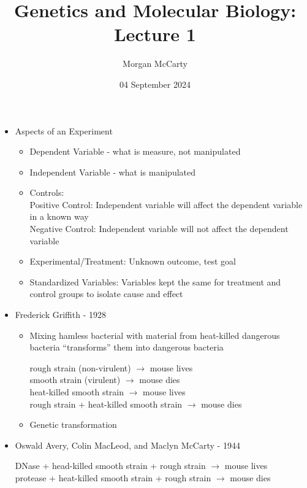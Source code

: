 \documentclass[12pt]{article}
\title{
    Genetics and Molecular Biology: Lecture 1}
\author{Morgan McCarty}
\date{04 September 2024}
\begin{document}
    \maketitle

    \begin{itemize}
        \item Aspects of an Experiment
        \begin{itemize}
            \item Dependent Variable - what is measure, not manipulated
            \item Independent Variable - what is manipulated
            \item Controls: \\
            Positive Control: Independent variable will affect the dependent variable in a known way \\
            Negative Control: Independent variable will not affect the dependent variable 
            \item Experimental/Treatment: Unknown outcome, test goal
            \item Standardized Variables: Variables kept the same for treatment and control groups to isolate cause and effect
        \end{itemize}
        \item Frederick Griffith - 1928
        \begin{itemize}
            \item Mixing hamless bacterial with material from heat-killed dangerous bacteria ``transforms'' them into dangerous bacteria
            \begin{center}
                rough strain (non-virulent) $\rightarrow$ mouse lives \\
                smooth strain (virulent) $\rightarrow$ mouse dies \\
                heat-killed smooth strain $\rightarrow$ mouse lives \\
                rough strain + heat-killed smooth strain $\rightarrow$ mouse dies
            \end{center}
            \item Genetic transformation
        \end{itemize}
        \item Oswald Avery, Colin MacLeod, and Maclyn McCarty - 1944
        \begin{center}
            DNase + head-killed smooth strain + rough strain $\rightarrow$ mouse lives \\
            protease + heat-killed smooth strain + rough strain $\rightarrow$ mouse dies \\
        \end{center}
    \end{itemize}
\end{document}
